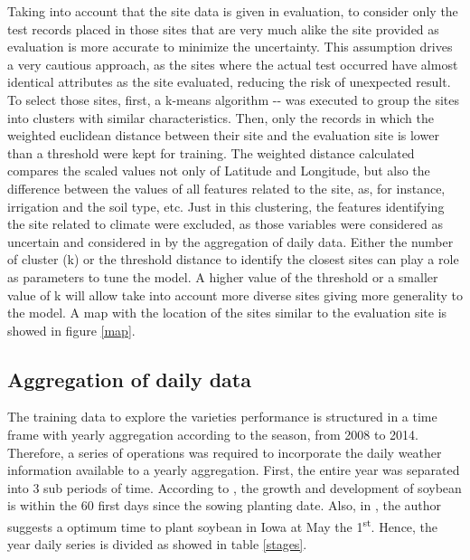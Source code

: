 \documentclass[syngen,nonblindrev]{informs3-syngen}
\begin{document}
Taking into account that the site data is given in evaluation, to consider only the test records placed in those sites that are very much alike the site provided as evaluation is more accurate to minimize the uncertainty. 
This assumption drives a very cautious approach, as the sites where the actual test occurred have almost identical attributes as the site evaluated, reducing the risk of unexpected result. 
To select those sites, first, a k-means algorithm -\cite{arrow1956berkeley}- was executed to group the sites into clusters with similar characteristics.
Then, only the records in which the weighted euclidean distance between their site and the evaluation site is lower than a threshold were kept for training. 
The weighted distance calculated compares the scaled values not only of Latitude and Longitude, but also the difference between the values of all features related to the site, as, for instance, irrigation and the soil type, etc.
Just in this clustering, the features identifying the site related to climate were excluded, as those variables were considered as uncertain and considered in by the aggregation of daily data.
Either the number of cluster (k) or the threshold distance to identify the closest sites can play a role as parameters to tune the model. 
A higher value of the threshold or a smaller value of k will allow take into account more diverse sites giving more generality to the model.
A map with the location of the sites similar to the evaluation site is showed in figure \ref{map}.

\subsection{Aggregation of daily data}

The training data to explore the varieties performance is structured in a time frame with yearly aggregation according to the season, from 2008 to 2014. 
Therefore, a series of operations was required to incorporate the daily weather information available to a yearly aggregation. 
First, the entire year was separated into 3 sub periods of time. 
According to \cite {pedersen2004soybean}, the growth and development of soybean is within the 60 first days since the sowing planting date. 
Also, in \cite{spd2006}, the author suggests a optimum time to plant soybean in Iowa at May the 1\textsuperscript{st}. 
Hence, the year daily series is divided as showed in table \ref{stages}.
\end{document}
